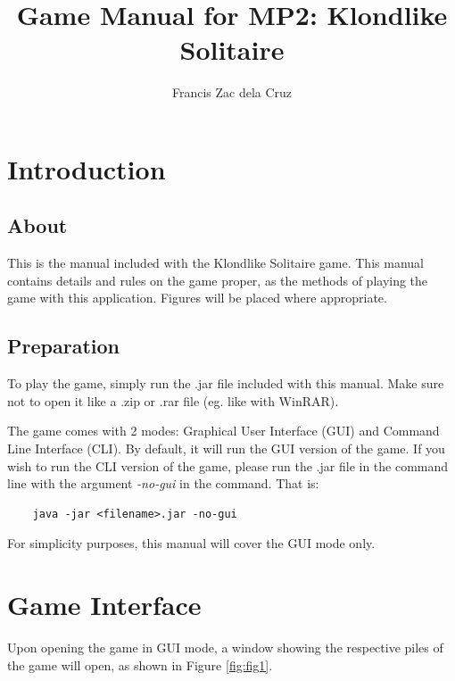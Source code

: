 \documentclass[12pt,a4paper,titlepage]{article}
\title{Game Manual for MP2: Klondlike Solitaire}
\date{}
\author{Francis Zac dela Cruz}
\begin{document}
	\maketitle

	\tableofcontents
	\newpage

	\section{Introduction}
	\subsection{About}
	This is the manual included with the Klondlike Solitaire game. This manual
	contains details and rules on the game proper, as the methods of playing the
	game with this application. Figures will be placed where appropriate.

	\subsection{Preparation}
	To play the game, simply run the .jar file included with this manual. Make
	sure not to open it like a .zip or .rar file (eg. like with WinRAR).

	The game comes with 2 modes: Graphical User Interface (GUI) and Command Line
	Interface (CLI). By default, it will run the GUI version of the game. If you
	wish to run the CLI version of the game, please run the .jar file in the
	command line with the argument \textit{-no-gui} in the command. That is:
	\begin{verbatim}
	java -jar <filename>.jar -no-gui
	\end{verbatim}

	For simplicity purposes, this manual will cover the GUI mode only.

	\newpage
	\section{Game Interface}
	Upon opening the game in GUI mode, a window showing the respective piles of
	the game will open, as shown in Figure \ref{fig:fig1}.
\end{document}
